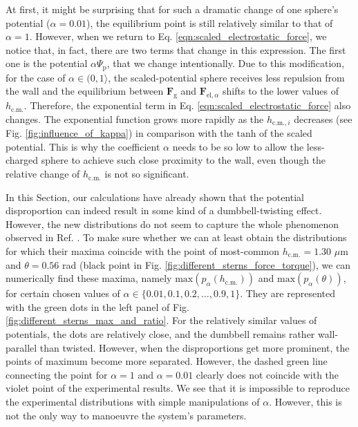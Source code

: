 \documentclass{master_thesis}
\begin{document}
At first, it might be surprising that for such a dramatic change of one sphere's potential ($\alpha=0.01$), the equilibrium point is still relatively similar to that of $\alpha=1$. However, when we return to Eq. \eqref{eqn:scaled_electrostatic_force}, we notice that, in fact, there are two terms that change in this expression. The first one is the potential $\alpha\Psi_{\textrm{p}}$, that we change intentionally. Due to this modification, for the case of $\alpha\in (0,1\rangle$, the scaled-potential sphere receives less repulsion from the wall and the equilibrium between $\boldsymbol{F}_{\textrm{g}}$ and $\boldsymbol{F}_{\textrm{el},\alpha}$ shifts to the lower values of $h_{\textrm{c.m.}}$. Therefore, the exponential term in Eq. \eqref{eqn:scaled_electrostatic_force} also changes. The exponential function grows more rapidly as the $h_{\textrm{c.m.},i}$ decreases (see Fig. \ref{fig:influence_of_kappa}) in comparison with the $\textrm{tanh}$ of the scaled potential. This is why the coefficient $\alpha$ needs to be so low to allow the less-charged sphere to achieve such close proximity to the wall, even though the relative change of $h_{\textrm{c.m.}}$ is not so significant.

In this Section, our calculations have already shown that the potential disproportion can indeed result in some kind of a dumbbell-twisting effect. However, the new distributions do not seem to capture the whole phenomenon observed in Ref. \cite{verweij2021}. To make sure whether we can at least obtain the distributions for which their maxima coincide with the point of most-common $h_{\textrm{c.m.}}=1.30$ $\mu$m and $\theta=0.56$ rad (black point in Fig. \ref{fig:different_sterns_force_torque}), we can numerically find these maxima, namely $\textrm{max}(p_\alpha(h_{\textrm{c.m.}}))$ and $\textrm{max}(p_\alpha(\theta))$, for certain chosen values of $\alpha\in\{ 0.01, 0.1, 0.2, \dots, 0.9, 1 \}$. They are represented with the green dots in the left panel of Fig. \ref{fig:different_sterns_max_and_ratio}. For the relatively similar values of potentials, the dots are relatively close, and the dumbbell remains rather wall-parallel than twisted. However, when the disproportions get more prominent, the points of maximum become more separated. However, the dashed green line connecting the point for $\alpha=1$ and $\alpha=0.01$ clearly does not coincide with the violet point of the experimental results. We see that it is impossible to reproduce the experimental distributions with simple manipulations of $\alpha$. However, this is not the only way to manoeuvre the system's parameters.
\end{document}
